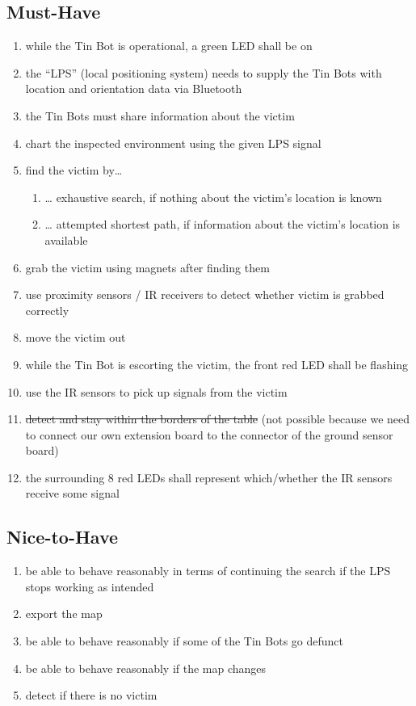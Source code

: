 \documentclass[a4paper,parskip,headheight=38pt]{scrartcl} %
\begin{document}
\subsection{Must-Have}
\begin{enumerate}[label=\musthave]
\item while the Tin Bot is operational, a green LED shall be on
\item the \enquote{LPS} (local positioning system) needs to supply the Tin Bots with location and orientation data via Bluetooth
\item the Tin Bots must share information about the victim
\item chart the inspected environment using the given LPS signal
\item find the victim by…
\begin{enumerate}
\item … exhaustive search, if nothing about the victim's location is known
\item … attempted shortest path, if information about the victim's location is available
\end{enumerate}
\item grab the victim using magnets after finding them
\item use proximity sensors / IR receivers to detect whether victim is grabbed correctly
\item move the victim out
\item while the Tin Bot is escorting the victim, the front red LED shall be flashing
\item use the IR sensors to pick up signals from the victim
\item \sout{detect and stay within the borders of the table} (not possible because we need to connect our own extension board to the connector of the ground sensor board)
\item the surrounding 8 red LEDs shall represent which/whether the IR sensors receive some signal
\end{enumerate}

\subsection{Nice-to-Have}
\begin{enumerate}[label=\nicetohave,ref=\nicetohave]
\item be able to behave reasonably in terms of continuing the search if the LPS stops working as intended\label{req:missLPS}
\item export the map
\item be able to behave reasonably if some of the Tin Bots go defunct \label{req:puckFault}
\item be able to behave reasonably if the map changes \label{req:mapChange}
\item detect if there is no victim
\end{enumerate}
\end{document}
